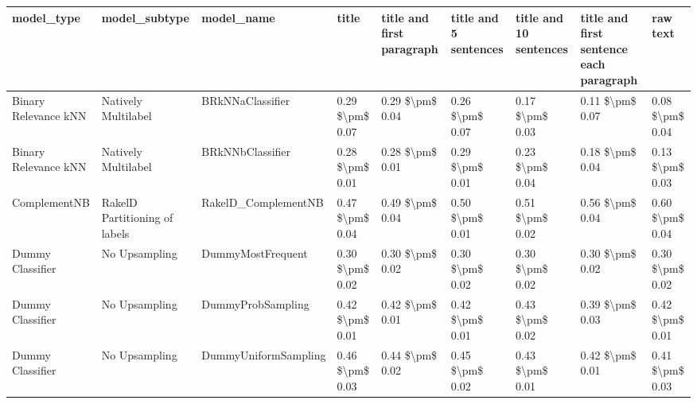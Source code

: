 \begin{tabular}{lllllllll}
\toprule
                     model\_type &                 model\_subtype &                                   model\_name &           title & title and first paragraph & title and 5 sentences & title and 10 sentences & title and first sentence each paragraph &            raw text \\
\midrule
           Binary Relevance kNN &           Natively Multilabel &                             BRkNNaClassifier & 0.29 \$\textbackslash pm\$ 0.07 &           0.29 \$\textbackslash pm\$ 0.04 &       0.26 \$\textbackslash pm\$ 0.07 &        0.17 \$\textbackslash pm\$ 0.03 &                         0.11 \$\textbackslash pm\$ 0.07 &     0.08 \$\textbackslash pm\$ 0.04 \\
           Binary Relevance kNN &           Natively Multilabel &                             BRkNNbClassifier & 0.28 \$\textbackslash pm\$ 0.01 &           0.28 \$\textbackslash pm\$ 0.01 &       0.29 \$\textbackslash pm\$ 0.01 &        0.23 \$\textbackslash pm\$ 0.04 &                         0.18 \$\textbackslash pm\$ 0.04 &     0.13 \$\textbackslash pm\$ 0.03 \\
                   ComplementNB & RakelD Partitioning of labels &                          RakelD\_ComplementNB & 0.47 \$\textbackslash pm\$ 0.04 &           0.49 \$\textbackslash pm\$ 0.04 &       0.50 \$\textbackslash pm\$ 0.01 &        0.51 \$\textbackslash pm\$ 0.02 &                         0.56 \$\textbackslash pm\$ 0.04 &     0.60 \$\textbackslash pm\$ 0.04 \\
               Dummy Classifier &                 No Upsampling &                            DummyMostFrequent & 0.30 \$\textbackslash pm\$ 0.02 &           0.30 \$\textbackslash pm\$ 0.02 &       0.30 \$\textbackslash pm\$ 0.02 &        0.30 \$\textbackslash pm\$ 0.02 &                         0.30 \$\textbackslash pm\$ 0.02 &     0.30 \$\textbackslash pm\$ 0.02 \\
               Dummy Classifier &                 No Upsampling &                            DummyProbSampling & 0.42 \$\textbackslash pm\$ 0.01 &           0.42 \$\textbackslash pm\$ 0.01 &       0.42 \$\textbackslash pm\$ 0.01 &        0.43 \$\textbackslash pm\$ 0.02 &                         0.39 \$\textbackslash pm\$ 0.03 &     0.42 \$\textbackslash pm\$ 0.01 \\
               Dummy Classifier &                 No Upsampling &                         DummyUniformSampling & 0.46 \$\textbackslash pm\$ 0.03 &           0.44 \$\textbackslash pm\$ 0.02 &       0.45 \$\textbackslash pm\$ 0.02 &        0.43 \$\textbackslash pm\$ 0.01 &                         0.42 \$\textbackslash pm\$ 0.01 &     0.41 \$\textbackslash pm\$ 0.03 \\

\end{tabular}
